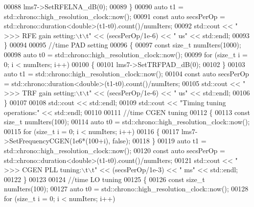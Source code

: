 \begin{DoxyCode}
00088             lms7->SetRFELNA\_dB(0);
00089         \}
00090         \textcolor{keyword}{auto} t1 = std::chrono::high\_resolution\_clock::now();
00091         \textcolor{keyword}{const} \textcolor{keyword}{auto} secsPerOp = std::chrono::duration<double>(t1-t0).count()/numIters;
00092         std::cout << \textcolor{stringliteral}{"  >>> RFE gain setting:\(\backslash\)t\(\backslash\)t"} << (secsPerOp/1e-6) << \textcolor{stringliteral}{" us"} << std::endl;
00093     \}
00094 
00095     \textcolor{comment}{//time PAD setting}
00096     \{
00097         \textcolor{keyword}{const} \textcolor{keywordtype}{size\_t} numIters(1000);
00098         \textcolor{keyword}{auto} t0 = std::chrono::high\_resolution\_clock::now();
00099         \textcolor{keywordflow}{for} (\textcolor{keywordtype}{size\_t} i = 0; i < numIters; i++)
00100         \{
00101             lms7->SetTRFPAD\_dB(0);
00102         \}
00103         \textcolor{keyword}{auto} t1 = std::chrono::high\_resolution\_clock::now();
00104         \textcolor{keyword}{const} \textcolor{keyword}{auto} secsPerOp = std::chrono::duration<double>(t1-t0).count()/numIters;
00105         std::cout << \textcolor{stringliteral}{"  >>> TRF gain setting:\(\backslash\)t\(\backslash\)t"} << (secsPerOp/1e-6) << \textcolor{stringliteral}{" us"} << std::endl;
00106     \}
00107 
00108     std::cout << std::endl;
00109     std::cout << \textcolor{stringliteral}{"Timing tuning operations:"} << std::endl;
00110 
00111     \textcolor{comment}{//time CGEN tuning}
00112     \{
00113         \textcolor{keyword}{const} \textcolor{keywordtype}{size\_t} numIters(100);
00114         \textcolor{keyword}{auto} t0 = std::chrono::high\_resolution\_clock::now();
00115         \textcolor{keywordflow}{for} (\textcolor{keywordtype}{size\_t} i = 0; i < numIters; i++)
00116         \{
00117             lms7->SetFrequencyCGEN(1e6*(100+i), \textcolor{keyword}{false});
00118         \}
00119         \textcolor{keyword}{auto} t1 = std::chrono::high\_resolution\_clock::now();
00120         \textcolor{keyword}{const} \textcolor{keyword}{auto} secsPerOp = std::chrono::duration<double>(t1-t0).count()/numIters;
00121         std::cout << \textcolor{stringliteral}{"  >>> CGEN PLL tuning:\(\backslash\)t\(\backslash\)t"} << (secsPerOp/1e-3) << \textcolor{stringliteral}{" ms"} << std::endl;
00122     \}
00123 
00124     \textcolor{comment}{//time LO tuning}
00125     \{
00126         \textcolor{keyword}{const} \textcolor{keywordtype}{size\_t} numIters(100);
00127         \textcolor{keyword}{auto} t0 = std::chrono::high\_resolution\_clock::now();
00128         \textcolor{keywordflow}{for} (\textcolor{keywordtype}{size\_t} i = 0; i < numIters; i++)

\end{DoxyCode}

